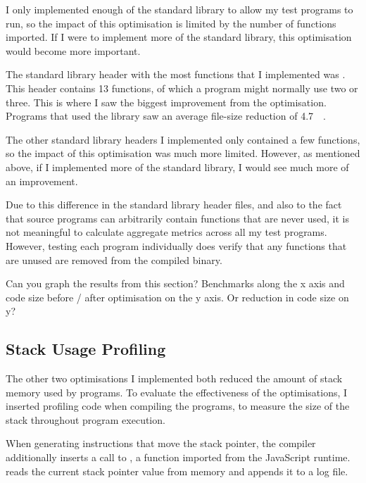 \documentclass[00-main.tex]{subfiles}
\begin{document}
I only implemented enough of the standard library to allow my test programs to run, so the impact of this optimisation is limited by the number of functions imported.
If I were to implement more of the standard library, this optimisation would become more important.

The standard library header with the most functions that I implemented was .
This header contains 13 functions, of which a program might normally use two or three.
This is where I saw the biggest improvement from the optimisation.
Programs that used the  library saw an average file-size reduction of \SI{4.7}{\kilo\byte}.

The other standard library headers I implemented only contained a few functions, so the impact of this optimisation was much more limited. However, as mentioned above, if I implemented more of the standard library, I would see much more of an improvement.

Due to this difference in the standard library header files, and also to the fact that source programs can arbitrarily contain functions that are never used, it is not meaningful to calculate aggregate metrics across all my test programs.
However, testing each program individually does verify that any functions that are unused are removed from the compiled binary.

\begin{Comment}
Can you graph the results from this section?  Benchmarks along the x
axis and code size before / after optimisation on the y axis.  Or
reduction in code size on y?
\end{Comment}

\subsection{Stack Usage Profiling}

The other two optimisations I implemented both reduced the amount of stack memory used by programs.
To evaluate the effectiveness of the optimisations, I inserted profiling code when compiling the programs, to measure the size of the stack throughout program execution.

When generating instructions that move the stack pointer, the compiler additionally inserts a call to , a function imported from the JavaScript runtime.
 reads the current stack pointer value from memory and appends it to a log file.
\end{document}
